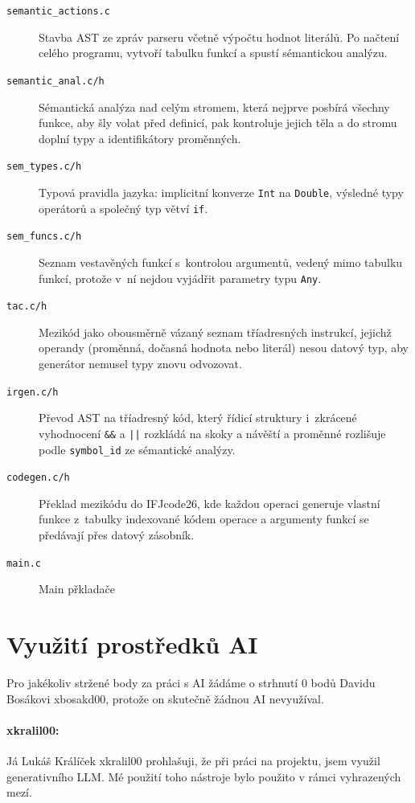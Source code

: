 \documentclass[a4paper,11pt]{article}
\begin{document}
\begin{description}
    \item[\texttt{semantic\_actions.c}] Stavba AST ze zpráv parseru včetně výpočtu hodnot literálů. Po načtení celého programu, vytvoří tabulku funkcí a spustí sémantickou analýzu. 
    \item[\texttt{semantic\_anal.c/h}] Sémantická analýza nad celým stromem, která nejprve posbírá všechny funkce, aby šly volat před definicí, pak kontroluje jejich těla a do stromu doplní typy a identifikátory proměnných.
    \item[\texttt{sem\_types.c/h}] Typová pravidla jazyka: implicitní konverze \texttt{Int} na \texttt{Double}, výsledné typy operátorů a společný typ větví \texttt{if}.
    \item[\texttt{sem\_funcs.c/h}] Seznam vestavěných funkcí s~kontrolou argumentů, vedený mimo tabulku funkcí, protože v~ní nejdou vyjádřit parametry typu \texttt{Any}.
    \item[\texttt{tac.c/h}] Mezikód jako obousměrně vázaný seznam tříadresných instrukcí, jejichž operandy (proměnná, dočasná hodnota nebo literál) nesou datový typ, aby generátor nemusel typy znovu odvozovat.
    \item[\texttt{irgen.c/h}] Převod AST na tříadresný kód, který řídicí struktury i~zkrácené vyhodnocení \texttt{\&\&} a \texttt{||} rozkládá na skoky a návěští a proměnné rozlišuje podle \texttt{symbol\_id} ze sémantické analýzy.
    \item[\texttt{codegen.c/h}] Překlad mezikódu do IFJcode26, kde každou operaci generuje vlastní funkce z~tabulky indexované kódem operace a argumenty funkcí se předávají přes datový zásobník.
    \item[\texttt{main.c}] Main přkladače

\end{description}

\section{Využití prostředků AI}
Pro jakékoliv stržené body za práci s AI žádáme o strhnutí 0 bodů Davidu Bosákovi xbosakd00, protože on skutečně žádnou AI nevyužíval.

\paragraph{xkralil00:}
Já Lukáš Králíček xkralil00 prohlašuji, že při práci na projektu, jsem využil generativního LLM.
Mé použití toho nástroje bylo použito v rámci vyhrazených mezí.
\end{document}

